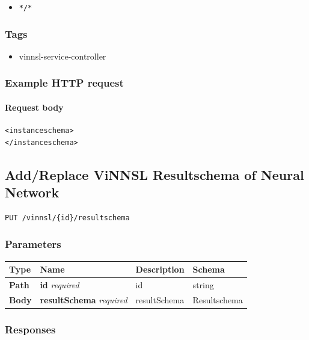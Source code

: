 \begin{itemize}
\tightlist
\item
  \texttt{*/*}
\end{itemize}

\subsubsection{Tags}\label{tags-7}

\begin{itemize}
\tightlist
\item
  vinnsl-service-controller
\end{itemize}

\subsubsection{Example HTTP request}\label{example-http-request-2}

\paragraph{Request body}\label{request-body-1}

\begin{verbatim}
<instanceschema>
</instanceschema>
\end{verbatim}

\subsection{Add/Replace ViNNSL Resultschema of Neural
Network}\label{addreplace-vinnsl-resultschema-of-neural-network}

\begin{verbatim}
PUT /vinnsl/{id}/resultschema
\end{verbatim}

\subsubsection{Parameters}\label{parameters-6}

\begin{longtable}[]{@{}llll@{}}
\toprule
Type & Name & Description & Schema\tabularnewline
\midrule
\endhead
\textbf{Path} & \textbf{id} \emph{required} & id & string\tabularnewline
\textbf{Body} & \textbf{resultSchema} \emph{required} & resultSchema &
Resultschema\tabularnewline
\bottomrule
\end{longtable}

\subsubsection{Responses}\label{responses-8}

